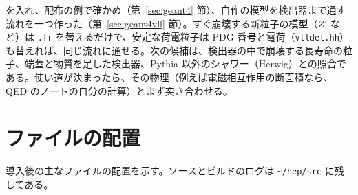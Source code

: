 \documentclass[a4paper,10pt]{ltjsarticle}
\newcommand{\pth}[1]{\texttt{\textasciitilde/}\nolinkurl{#1}}
\begin{document}
を入れ、配布の例で確かめ（第~\ref{sec:geant4} 節）、自作の模型を検出器まで通す流れを一つ作った（第~\ref{sec:geant4vll} 節）。すぐ崩壊する新粒子の模型（$Z'$ など）は \texttt{.fr} を替えるだけで、安定な荷電粒子は PDG 番号と電荷（\texttt{vlldet.hh}）も替えれば、同じ流れに通せる。次の候補は、検出器の中で崩壊する長寿命の粒子、端蓋と物質を足した検出器、Pythia 以外のシャワー（Herwig）との照合である。使い道が決まったら、その物理（例えば電磁相互作用の断面積なら、QED のノートの自分の計算）とまず突き合わせる。

\appendix

\section{ファイルの配置}\label{app:layout}

導入後の主なファイルの配置を示す。ソースとビルドのログは \pth{hep/src} に残してある。
\end{document}
